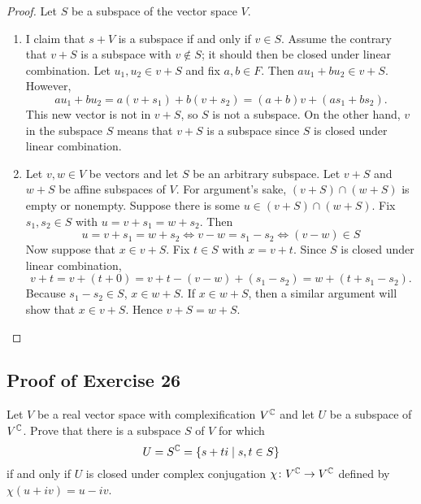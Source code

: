 \begin{proof} Let $S$ be a subspace of the vector space $V$.
\begin{enumerate}[label=\alph*.]
\item I claim that $s+V$ is a subspace if and only if $v\in S$. Assume the contrary that $v+S$ is a subspace with $v\notin S$; it should then be closed under linear combination. Let $u_1,u_2\in v+S$ and fix $a,b\in F$. Then $au_1 + bu_2\in v+S$. However,
\[
	au_1 + bu_2 = a(v+s_1) + b(v+s_2) = (a+b)v + (as_1 + bs_2).
\]
This new vector is not in $v+S$, so $S$ is not a subspace. On the other hand, $v$ in the subspace $S$ means that $v+S$ is a subspace since $S$ is closed under linear combination.

\item Let $v,w\in V$ be vectors and let $S$ be an arbitrary subspace. Let $v + S$ and $w + S$ be affine subspaces of $V$. For argument's sake, $(v + S)\cap(w + S)$ is empty or nonempty. Suppose there is some $u\in (v+S)\cap(w+S)$. Fix $s_1,s_2\in S$ with $u = v + s_1 = w + s_2$. Then 
\[
	u = v + s_1 = w + s_2 \Leftrightarrow v - w = s_1 - s_2 \Leftrightarrow (v - w) \in S
\]
Now suppose that $x\in v + S$. Fix $t\in S$ with $x = v + t$. Since $S$ is closed under linear combination,
\[
	v + t = v + (t + 0) = v + t - (v - w) + (s_1 - s_2) = w + (t + s_1 - s_2).
\]
Because $s_1 - s_2\in S$, $x\in w + S$. If $x\in w+S$, then a similar argument will show that $x\in v+S$. Hence $v + S = w + S$.


\end{enumerate}
\end{proof}

\vfill
\pagebreak

\subsection{Proof of Exercise 26}
Let $V$ be a real vector space with complexification $V^{\mathbb{C}}$ and let $U$ be a subspace of $V^{\mathbb{C}}$. Prove that there is a subspace $S$ of $V$ for which
\[U=S^{\mathbb{C}}=\{s+ti\mid s,t\in S\}\]
if and only if $U$ is closed under complex conjugation $\chi\colon V^{\mathbb{C}}\rightarrow V^{\mathbb{C}}$ defined by $\chi(u+iv)=u-iv$.

